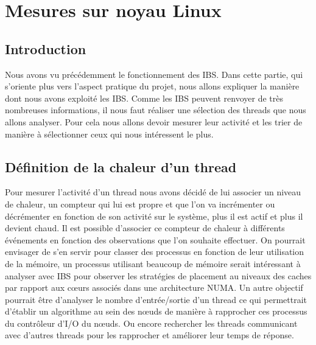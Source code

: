 \chapter{Mesures sur noyau Linux}
\section{Introduction}
Nous avons vu précédemment le fonctionnement des IBS. Dans cette partie, qui s'oriente plus vers l'aspect pratique du projet, nous allons expliquer la manière dont nous avons exploité les IBS. Comme les IBS peuvent renvoyer de très nombreuses informations, il nous faut réaliser une sélection des threads que nous allons analyser. Pour cela nous allons devoir mesurer leur activité et les trier de manière à sélectionner ceux qui nous intéressent le plus.
\section{Définition de la chaleur d'un thread}
Pour mesurer l'activité d'un thread nous avons décidé de lui associer un niveau de chaleur, un compteur qui lui est propre et que l'on va incrémenter ou décrémenter en fonction de son activité sur le système, plus il est actif et plus il devient chaud. Il est possible d'associer ce compteur de chaleur à différents événements en fonction des observations que l'on souhaite effectuer. On pourrait envisager de s'en servir pour classer des processus en fonction de leur utilisation de la mémoire, un processus utilisant beaucoup de mémoire serait intéressant à analyser avec IBS pour observer les stratégies de placement au niveaux des caches par rapport aux cœurs associés dans une architecture NUMA. Un autre objectif pourrait être d'analyser le nombre d'entrée/sortie d'un thread ce qui permettrait d'établir un algorithme au sein des nœuds de manière à rapprocher ces processus du contrôleur d'I/O du nœuds. Ou encore rechercher les threads communicant avec d'autres threads pour les rapprocher et améliorer leur temps de réponse.

